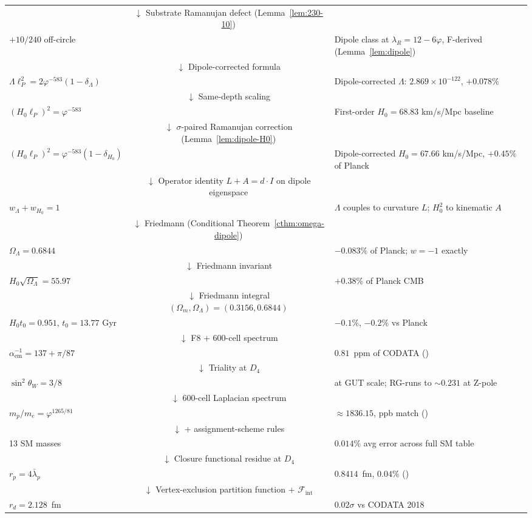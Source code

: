 \documentclass[11pt]{article}
\theoremstyle{plain}
\theoremstyle{definition}
\theoremstyle{remark}
\newcommand{\Fcal}{\mathcal{F}}
\begin{document}
\begin{center}
\begin{tabular}{lcl}
& $\downarrow$ Substrate Ramanujan defect (Lemma~\ref{lem:230-10}) & \\
$+ 10/240$ off-circle & & Dipole class at $\lambda_R = 12 - 6\varphi$, F-derived (Lemma~\ref{lem:dipole}) \\
& $\downarrow$ Dipole-corrected formula & \\
$\boxed{\Lambda \ell_P^2 = 2\varphi^{-583}(1 - \delta_\Lambda)}$ & & Dipole-corrected $\Lambda$: $2.869 \times 10^{-122}$, $+0.078\%$ \\
& $\downarrow$ Same-depth scaling & \\
$(H_0 \ell_P)^2 = \varphi^{-583}$ & & First-order $H_0 = 68.83$ km/s/Mpc baseline \\
& $\downarrow$ $\sigma$-paired Ramanujan correction (Lemma~\ref{lem:dipole-H0}) & \\
$\boxed{(H_0 \ell_P)^2 = \varphi^{-583}(1 - \delta_{H_0})}$ & & Dipole-corrected $H_0 = 67.66$ km/s/Mpc, $+0.45\%$ of Planck \\
& $\downarrow$ Operator identity $L + A = d \cdot I$ on dipole eigenspace & \\
$w_\Lambda + w_{H_0} = 1$ & & $\Lambda$ couples to curvature $L$; $H_0^2$ to kinematic $A$ \\
& $\downarrow$ Friedmann (Conditional Theorem~\ref{cthm:omega-dipole}) & \\
$\Omega_\Lambda = 0.6844$ & & $-0.083\%$ of Planck; $w = -1$ exactly \\
& $\downarrow$ Friedmann invariant & \\
$H_0\sqrt{\Omega_\Lambda} = 55.97$ & & $+0.38\%$ of Planck CMB \\
& $\downarrow$ Friedmann integral $(\Omega_m, \Omega_\Lambda) = (0.3156, 0.6844)$ & \\
$H_0 t_0 = 0.951$, $t_0 = 13.77$ Gyr & & $-0.1\%$, $-0.2\%$ vs Planck \\
& $\downarrow$ F8 + 600-cell spectrum & \\
$\alpha_\mathrm{em}^{-1} = 137 + \pi/87$ & & $0.81$~ppm of CODATA (\citealp{SmartXXII}) \\
& $\downarrow$ Triality at $D_4$ & \\
$\sin^2\theta_W = 3/8$ & & at GUT scale; RG-runs to $\sim 0.231$ at Z-pole \\
& $\downarrow$ 600-cell Laplacian spectrum & \\
$m_p/m_e = \varphi^{1265/81}$ & & $\approx 1836.15$, ppb match (\citealp{SmartV}) \\
& $\downarrow$ + assignment-scheme rules & \\
13 SM masses & & $0.014\%$ avg error across full SM table \\
& $\downarrow$ Closure functional residue at $D_4$ & \\
$r_p = 4\bar\lambda_p$ & & $0.8414$~fm, $0.04\%$ (\citealp{SmartXXXII}) \\
& $\downarrow$ Vertex-exclusion partition function + $\Fcal_\mathrm{int}$ & \\
$r_d = 2.128$~fm & & $0.02\sigma$ vs CODATA 2018 \\
\bottomrule
\end{tabular}
\end{center}
\end{document}
